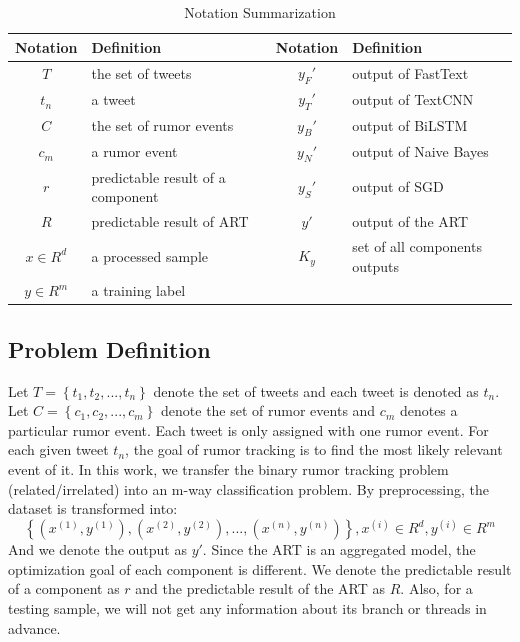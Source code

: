 \begin{table}
	\caption{Notation Summarization}
	\centering
	\label{tab:notations}
		\begin{tabular}{|c|l|c|l|}
			\hline
			\textbf{Notation} & \textbf{Definition} & \textbf{Notation}& \textbf{Definition}\\
			\hline
			$T$ & the set of tweets & $y_F'$ & output of FastText \\
			\hline
			$t_n$ & a tweet&$y_T'$ & output of TextCNN\\
			\hline
			$C$ & the set of rumor events&$y_B'$ & output of BiLSTM\\
			\hline
			$c_m$ & a rumor event&$y_N'$ & output of Naive Bayes\\
			\hline
			$r$ & predictable result of a component&$y_S'$ & output of SGD\\
			\hline
			$R$ & predictable result of ART& $y'$& output of the ART\\
			\hline
			$x \in R^d$ & a processed sample& $K_y$& set of all components outputs\\
			\hline
			$y \in R^m$ & a training label&&\\
			\hline						
		\end{tabular}
\end{table}

\subsection{Problem Definition}
\label{sec:problem}
Let $T = \left\{t_1, t_2, ..., t_n \right\}$ denote the set of tweets and each tweet is denoted as $t_n$. Let $C = \left\{c_1, c_2, ... , c_m \right\}$ denote the set of rumor events and $c_m$ denotes a particular rumor event. Each tweet is only assigned with one rumor event. For each given tweet $t_n$, the goal of rumor tracking is to find the most likely relevant event of it. In this work, we transfer the binary rumor tracking problem (related/irrelated) into an m-way classification problem. By preprocessing, the dataset is transformed into: $$\left\{ (x^{(1)}, y^{(1)}), (x^{(2)}, y^{(2)}),..., (x^{(n)}, y^{(n)}) \right\}, x^{(i)} \in R^d, y^{(i)} \in R^m $$ And we denote the output as $y'$. Since the ART is an aggregated model, the optimization goal of each component is different. We denote the predictable result of a component as $r$ and the predictable result of the ART as $R$. Also, for a testing sample, we will not get any information about its branch or threads in advance. 

